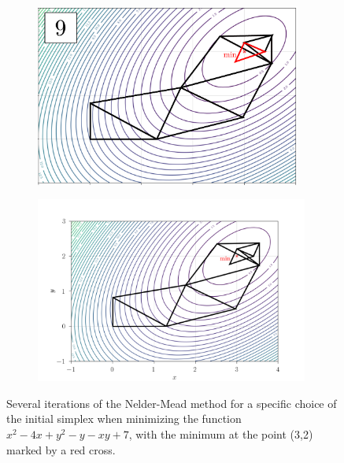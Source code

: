 \begin{figure}[H]
\begin{subfigure}[b]{0.32\textwidth}
	\end{subfigure}
	\begin{subfigure}[b]{0.32\textwidth}
		\centering
		\includegraphics[width=0.96\textwidth, trim={0 0 0 0}]{figures/nelder9.pdf}
	\end{subfigure}
	\begin{center}
		\begin{subfigure}[b]{0.66\textwidth}
			\centering
			\includegraphics[width=0.985\textwidth, trim={0 6mm 0 9mm}]{figures/nelder.png}
		\end{subfigure}
	\end{center}
	
	\caption{Several iterations of the Nelder-Mead method for a specific choice of the initial simplex when minimizing the function $ x^2 - 4x + y^2 - y - xy + 7 $, with the minimum at the point (3,2) marked by a red cross.}
	\label{fig:NM}
\end{figure}

